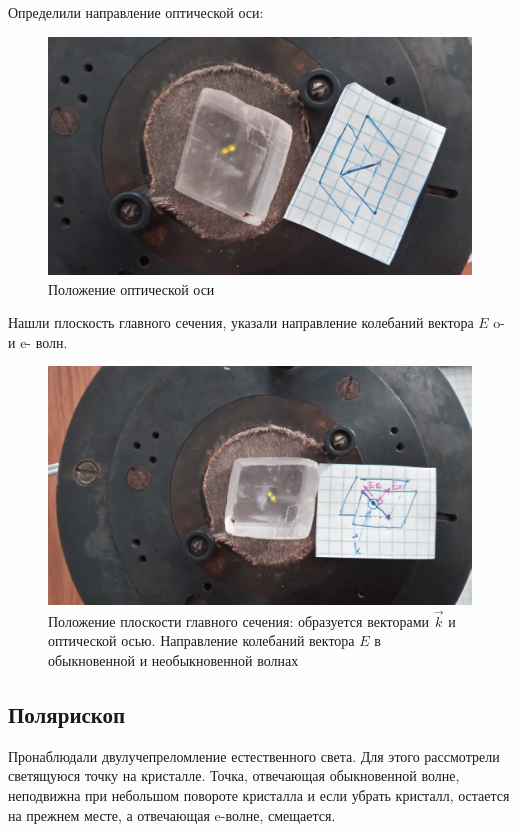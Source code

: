 Определили направление оптической оси:
\begin{figure}[H]
	\centering
	\includegraphics[width=\textwidth]{pic/rot_eo.jpg}
	\caption{Положение оптической оси}
	\label{fig:figure1}
\end{figure}

Нашли плоскость главного сечения, указали направление колебаний вектора $E$ o- и e- волн.
\begin{figure}[H]
	\centering
	\includegraphics[width=\textwidth]{pic/eo.jpg}
	\caption{Положение плоскости главного сечения: образуется векторами $\vec{k}$ и оптической осью. Направление колебаний вектора $E$ в обыкновенной и необыкновенной волнах}
	\label{fig:figure1}
\end{figure}

\subsection{Полярископ}

Пронаблюдали двулучепреломление естественного света. Для этого рассмотрели светящуюся точку на кристалле. Точка, отвечающая обыкновенной волне, неподвижна при небольшом повороте кристалла и если убрать кристалл, остается на прежнем месте, а отвечающая e-волне, смещается.

